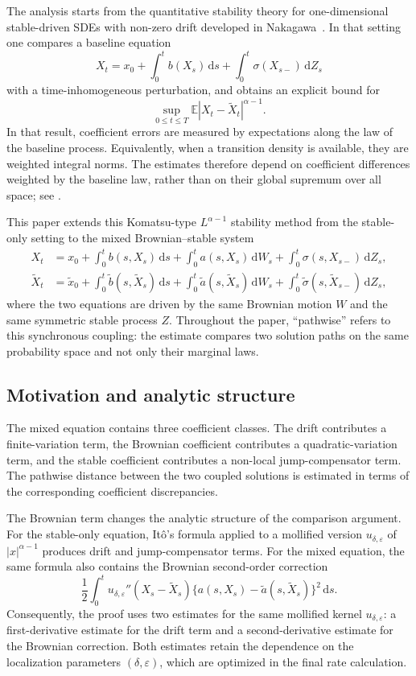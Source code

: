\documentclass[11pt]{article}
\newcommand{\1}{\mathbf{1}}
\newcommand{\dd}{\,\mathrm{d}}
\newcommand{\wt}{\tilde}
\newcommand{\eps}{\varepsilon}
\begin{document}
The analysis starts from the quantitative stability theory for one-dimensional stable-driven SDEs with non-zero drift developed in Nakagawa~\cite{Nakagawa2026}. In that setting one compares a baseline equation
\[
  X_t=x_0+\int_0^t b(X_s)\dd s+\int_0^t\sigma(X_{s-})\dd Z_s
\]
with a time-inhomogeneous perturbation, and obtains an explicit bound for
\[
  \sup_{0\le t\le T}\mathbb E|X_t-\wt X_t|^{\alpha-1}.
\]
In that result, coefficient errors are measured by expectations along the law of the baseline process. Equivalently, when a transition density is available, they are weighted integral norms. The estimates therefore depend on coefficient differences weighted by the baseline law, rather than on their global supremum over all space; see \cite{Nakagawa2026}.

This paper extends this Komatsu-type $L^{\alpha-1}$ stability method from the stable-only setting to the mixed Brownian--stable system
\begin{align*}
X_t &= x_0+
\int_0^t b(s,X_s)\dd s+
\int_0^t a(s,X_s)\dd W_s+
\int_0^t \sigma(s,X_{s-})\dd Z_s,\\
\wt X_t &= \wt x_0+
\int_0^t \wt b(s,\wt X_s)\dd s+
\int_0^t \wt a(s,\wt X_s)\dd W_s+
\int_0^t \wt\sigma(s,\wt X_{s-})\dd Z_s,
\end{align*}
where the two equations are driven by the same Brownian motion $W$ and the same symmetric stable process $Z$. Throughout the paper, ``pathwise'' refers to this synchronous coupling: the estimate compares two solution paths on the same probability space and not only their marginal laws.

\subsection{Motivation and analytic structure}
\label{subsec:motivation}

The mixed equation contains three coefficient classes. The drift contributes a finite-variation term, the Brownian coefficient contributes a quadratic-variation term, and the stable coefficient contributes a non-local jump-compensator term. The pathwise distance between the two coupled solutions is estimated in terms of the corresponding coefficient discrepancies.

The Brownian term changes the analytic structure of the comparison argument. For the stable-only equation, It\^o's formula applied to a mollified version $u_{\delta,\eps}$ of $|x|^{\alpha-1}$ produces drift and jump-compensator terms. For the mixed equation, the same formula also contains the Brownian second-order correction
\[
  \frac12\int_0^t u_{\delta,\eps}''(X_s-\wt X_s)
  \{a(s,X_s)-\wt a(s,\wt X_s)\}^2\dd s.
\]
Consequently, the proof uses two estimates for the same mollified kernel $u_{\delta,\eps}$: a first-derivative estimate for the drift term and a second-derivative estimate for the Brownian correction. Both estimates retain the dependence on the localization parameters $(\delta,\eps)$, which are optimized in the final rate calculation.
\end{document}
